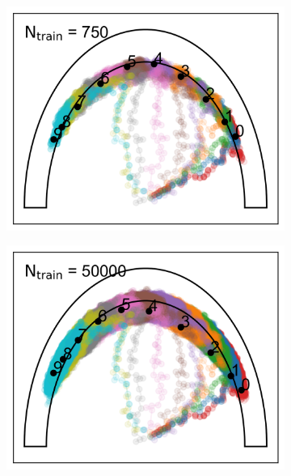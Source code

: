 \documentclass[aps,prb,twocolumn,superscriptaddress,floatfix,longbibliography]{revtex4-2}
\begin{document}
\begin{figure}
\begin{subfigure}[b]{0.24\textwidth}
      \includegraphics[width=\textwidth]{ej2_fig2_3.png}
      \caption{\label{fig:ej2_fig2_3}}
  \end{subfigure}
  \hfill
  \begin{subfigure}[b]{0.24\textwidth}
      \centering
      \includegraphics[width=\textwidth]{ej2_fig2_4.png}
      \caption{\label{fig:ej2_fig2_4}}
  \end{subfigure}
  \hfill
  \begin{subfigure}[b]{0.24\textwidth}
      \centering

\end{subfigure}
\end{figure}
\end{document}
